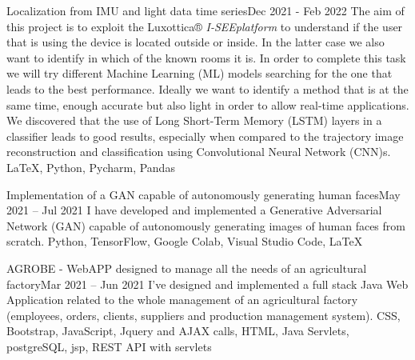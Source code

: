 %
%
%



\begin{projects}
    \projectNoLink
        {Localization from IMU and light data time series}{Dec 2021 - Feb 2022}
        {The aim of this project is to exploit the Luxottica® \textit{I-SEEplatform} to understand if the user that is using the device is located outside or inside. In the latter case we also want to identify in which of the known rooms it is. In order to complete this task we will try different Machine Learning (ML) models searching for the one that leads to the best performance. Ideally we want to identify a method that is at the same time, enough accurate but also light in order to allow real-time applications. We discovered that the use of Long Short-Term Memory (LSTM) layers in a classifier leads to good results, especially when compared to the trajectory image reconstruction and classification using Convolutional Neural Network (CNN)s.}
        {\LaTeX, Python, Pycharm, Pandas}
    	
	\projectNoLink
    	{Implementation of a GAN capable of autonomously generating human faces}{May 2021 – Jul 2021}
    	{I have developed and implemented a Generative Adversarial Network (GAN) capable of autonomously generating images of human faces from scratch.}
    	{Python, TensorFlow, Google Colab, Visual Studio Code, \LaTeX}
	
	\project
    	{AGROBE - WebAPP designed to manage all the needs of an agricultural factory}{Mar 2021 – Jun 2021}
    	{}
    	{I've designed and implemented a full stack Java Web Application related to the whole management of an agricultural factory (employees, orders, clients, suppliers and production management system).}
    	{CSS, Bootstrap, JavaScript, Jquery and AJAX calls, HTML, Java Servlets, postgreSQL, jsp, REST API with servlets}
				
    	

\end{projects}
